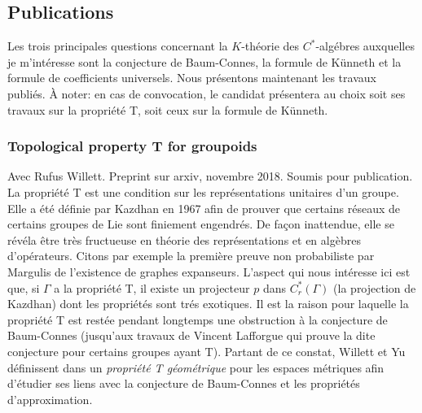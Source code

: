 \documentclass[a4paper,11pt]{article}
\begin{document}
\subsection*{Publications}

Les trois principales questions concernant la $K$-th\'eorie des $C^*$-alg\'ebres auxquelles je m'int\'eresse sont la conjecture de Baum-Connes, la formule de K\"unneth et la formule de coefficients universels. Nous pr\'esentons maintenant les travaux publi\'es. \`A noter: en cas de convocation, le candidat pr\'esentera au choix soit ses travaux sur la propri\'et\'e T, soit ceux sur la formule de K\"unneth.

\subsubsection*{Topological property T for groupoids} 
Avec Rufus Willett. Preprint sur arxiv, novembre 2018. Soumis pour publication.\\

La propri\'et\'e T est une condition sur les repr\'esentations unitaires d'un groupe. Elle a \'et\'e d\'efinie par Kazdhan \cite{kazhdan1967connection} en 1967 afin de prouver que certains r\'eseaux de certains groupes de Lie sont finiement engendr\'es. De fa\c{c}on inattendue, elle se r\'ev\'ela \^etre tr\`es fructueuse en th\'eorie des repr\'esentations et en alg\`ebres d'op\'erateurs. Citons par exemple la premi\`ere preuve non probabiliste par Margulis de l'existence de graphes expanseurs. L'aspect qui nous int\'eresse ici est que, si $\Gamma$ a la propri\'et\'e T, il existe un projecteur $p$ dans $C^*_r(\Gamma)$ (la projection de Kazdhan) dont les propri\'et\'es sont tr\'es exotiques. Il est la raison pour laquelle la propri\'et\'e T est rest\'ee pendant longtemps une obstruction \`a la conjecture de Baum-Connes (jusqu'aux travaux de Vincent Lafforgue \cite{lafforgue2002k} qui prouve la dite conjecture pour certains groupes ayant T). Partant de ce constat, Willett et Yu d\'efinissent dans \cite{WillettYu} un \textit{propri\'et\'e T g\'eom\'etrique} pour les espaces m\'etriques afin d'\'etudier ses liens avec la conjecture de Baum-Connes et les propri\'et\'es d'approximation.\\
\end{document}
